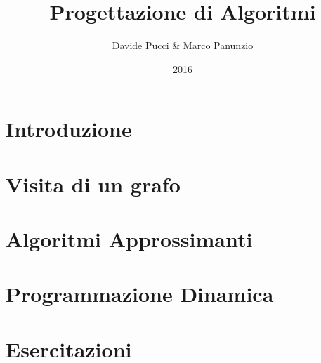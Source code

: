 

\title{Progettazione di Algoritmi}
\author{Davide Pucci \& Marco Panunzio}
\date{2016}



\maketitle

\tableofcontents

\chapter{Introduzione}


\chapter{Visita di un grafo}


\chapter{Algoritmi Approssimanti}


\chapter{Programmazione Dinamica}


\chapter{Esercitazioni}


